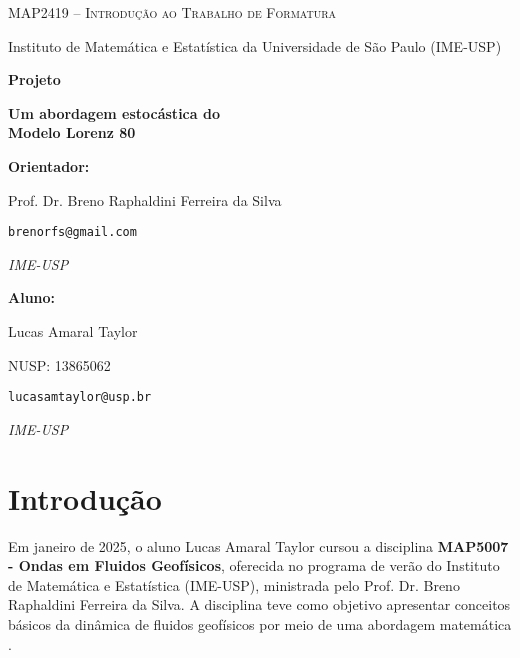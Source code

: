 \documentclass[12pt]{article}
\begin{document}
\begin{titlepage}
    \centering
    {\Large\scshape MAP2419 -- Introdução ao Trabalho de Formatura \par}
    \vspace{0.3cm}
    {\large Instituto de Matemática e Estatística da Universidade de São Paulo (IME-USP)\par}
    
    \vspace{3cm}
    
    {\LARGE\bfseries Projeto\par}
    \vspace{1cm}
    {\LARGE\bfseries Um abordagem estocástica do\\ Modelo Lorenz 80\par}
    
    \vfill
    
    \begin{minipage}[t]{0.45\textwidth}
        \raggedright
        \textbf{Orientador:} \par
        Prof. Dr. Breno Raphaldini Ferreira da Silva  \par
        \texttt{brenorfs@gmail.com} \par
        \textit{IME-USP} \par\medskip
    \end{minipage}
    \hfill
    \begin{minipage}[t]{0.45\textwidth}
        \raggedright
        \textbf{Aluno:} \par
        Lucas Amaral Taylor \par
        NUSP: 13865062 \par
        \texttt{lucasamtaylor@usp.br} \par
        \textit{IME-USP}
    \end{minipage}
    \vspace{2cm}
\end{titlepage}

\section*{Introdução}
Em janeiro de 2025, o aluno Lucas Amaral Taylor cursou a disciplina \textbf{MAP5007 - Ondas em Fluidos Geofísicos}, oferecida no programa de verão do Instituto de Matemática e Estatística (IME-USP), ministrada pelo Prof. Dr. Breno Raphaldini Ferreira da Silva. A disciplina teve como objetivo apresentar conceitos básicos da dinâmica de fluidos geofísicos por meio de uma abordagem matemática \citep{uspJanus}.
\end{document}
